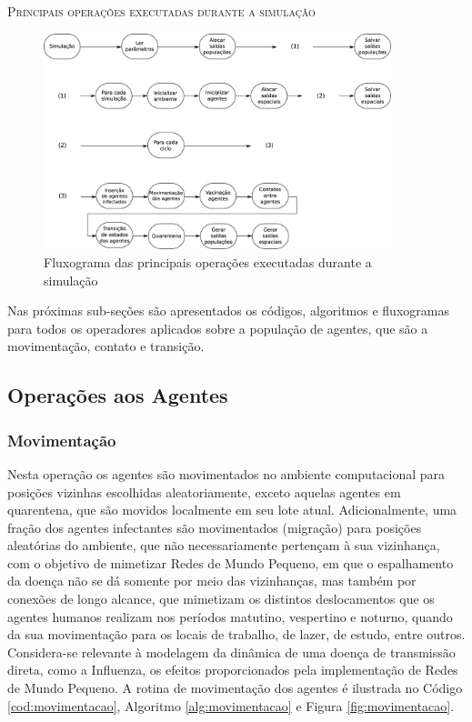 \newpage

\begin{algorithm}[H]
 \SetAlgoLined
 
 \caption{\textsc{Principais operações executadas durante a simulação}} 
 \label{alg:rotina_principal}
\end{algorithm}

\begin{figure}[H]
  \centering
  \includegraphics[width=0.9\textwidth]{Figuras/EstruturasDadosEstrategias/main.eps}
  \caption{Fluxograma das principais operações executadas durante a simulação}
  \label{fig:rotina_principal}
\end{figure} 

Nas próximas sub-seções são apresentados os códigos, algoritmos e fluxogramas para todos os operadores aplicados sobre a população de agentes, que são a movimentação, contato e transição. 

\newpage

\subsection{Operações aos Agentes}

\subsubsection{Movimentação}

Nesta operação os agentes são movimentados no ambiente computacional para posições vizinhas escolhidas aleatoriamente, exceto aquelas agentes em quarentena, que são movidos localmente em seu lote atual. Adicionalmente, uma fração dos agentes infectantes são movimentados (migração) para posições aleatórias do ambiente, que não necessariamente pertençam à sua vizinhança, com o objetivo de mimetizar Redes de Mundo Pequeno, em que o espalhamento da doença não se dá somente por meio das vizinhanças, mas também por conexões de longo alcance, que mimetizam os distintos deslocamentos que os agentes humanos realizam nos períodos matutino, vespertino e noturno, quando da sua movimentação para os locais de trabalho, de lazer, de estudo, entre outros. Considera-se relevante à modelagem da dinâmica de uma doença de transmissão direta, como a Influenza, os efeitos proporcionados pela implementação de Redes de Mundo Pequeno. A rotina de movimentação dos agentes é ilustrada no Código \ref{cod:movimentacao}, Algoritmo \ref{alg:movimentacao} e Figura \ref{fig:movimentacao}.  

